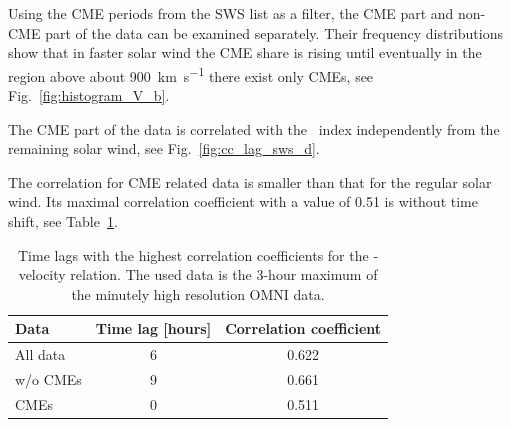 Using the CME periods from the SWS list as a filter, the CME part and non-CME part of the data can be examined separately. Their frequency distributions show that in faster solar wind the CME share is rising until eventually in the region above about \SI{900}{\km\per\s} there exist only CMEs, see Fig.~\ref{fig:histogram_V_b}.

The CME part of the data is correlated with the \Kp~index independently from the remaining solar wind, see Fig.~\ref{fig:cc_lag_sws_d}.
\begin{figure}
\end{figure}
The correlation for CME related data is smaller than that for the regular solar wind. Its maximal correlation coefficient with a value of 0.51 is without time shift, see Table~\ref{tab:correlation_coefficients_kpvsv}.
\begin{table}
	\caption{Time lags with the highest correlation coefficients for the \Kp{}-velocity relation. The used data is the 3-hour maximum of the minutely high resolution OMNI data.}
	\label{tab:correlation_coefficients_kpvsv}
	\centering
	\begin{tabular}{lcc}
		\hline\hline
		Data	&Time lag [hours]	&Correlation coefficient\\
		\hline
		All data	&6	&0.622\\
		w/o CMEs	&9	&0.661\\
		CMEs	&0	&0.511\\
		\hline
	\end{tabular}
\end{table}
